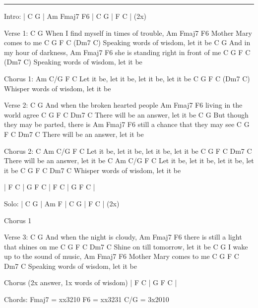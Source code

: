 \noindent\rule{\columnwidth}{1pt}

\begin{multicols}{2}
\begin{lstsong}
Intro: | C G | Am Fmaj7 F6 | C G | F C | (2x)

Verse 1:
       C              G
When I find myself in times of trouble,
Am            Fmaj7       F6
Mother Mary comes to me
C                 G              F C (Dm7 C)
Speaking words of wisdom, let it be
    C             G
And in my hour of darkness,
       Am                Fmaj7      F6
she is standing right in front of me
C                 G              F C (Dm7 C)
Speaking words of wisdom, let it be

Chorus 1:
       Am         C/G        F          C
Let it be, let it be, let it be, let it be
C                G              F C (Dm7 C)
Whisper words of wisdom, let it be

Verse 2:
    C               G
And when the broken hearted people
Am            Fmaj7      F6
living in the world agree
C                G              F C Dm7 C
There will be an answer, let it be
    C                  G
But though they may be parted, there is
Am                  Fmaj7       F6
still a chance that they may see
C                G              F C Dm7 C
There will be an answer, let it be

Chorus 2:
C      Am         C/G        F          C
Let it be, let it be, let it be, let it be
C                G              F C Dm7 C
There will be an answer, let it be
C      Am         C/G        F          C
Let it be, let it be, let it be, let it be
C                G              F C Dm7 C
Whisper words of wisdom, let it be

| F C | G F C | F C | G F C |

Solo: | C G | Am F | C G | F C | (2x)

Chorus 1

Verse 3:
    C                 G
And when the night is cloudy,
         Am                 Fmaj7        F6
there is still a light that shines on me
C                 G            F C Dm7 C
Shine on till tomorrow, let it be
  C              G
I wake up to the sound of music,
Am          Fmaj7      F6
Mother Mary comes to me
C                 G              F C Dm7 C
Speaking words of wisdom, let it be

Chorus (2x answer, 1x words of wisdom)
| F C | G F C |
\end{lstsong}
\begin{lsttab}
Chords:
Fmaj7  =  xx3210
F6     =  xx3231
C/G    =  3x2010
\end{lsttab}
\end{multicols}
\newpage


